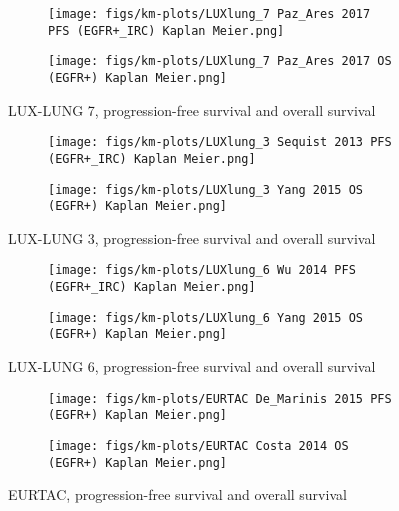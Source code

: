 \documentclass[11pt,final,fleqn]{article}\usepackage[]{graphicx}\usepackage[]{color}
\theoremstyle{plain}
\begin{document}
\begin{appendices}
\begin{figure}
\centering
\begin{subfigure}{\textwidth}
\centering
\texttt{[image: figs/km-plots/LUXlung\_7 Paz\_Ares 2017 PFS (EGFR+\_IRC) Kaplan Meier.png]}
\end{subfigure}
\begin{subfigure}{\textwidth}
\texttt{[image: figs/km-plots/LUXlung\_7 Paz\_Ares 2017 OS (EGFR+) Kaplan Meier.png]}
\end{subfigure}
\centering
\caption{LUX-LUNG 7, progression-free survival and overall survival}\label{fig:LUX-LUNG 7}
\end{figure}


\begin{figure}
\centering
\begin{subfigure}{\textwidth}
\centering
\texttt{[image: figs/km-plots/LUXlung\_3 Sequist 2013 PFS (EGFR+\_IRC) Kaplan Meier.png]}
\end{subfigure}
\begin{subfigure}{\textwidth}
\texttt{[image: figs/km-plots/LUXlung\_3 Yang 2015 OS (EGFR+) Kaplan Meier.png]}
\end{subfigure}
\centering
\caption{LUX-LUNG 3, progression-free survival and overall survival}\label{fig:LUX-LUNG 3}
\end{figure}


\begin{figure}
\centering
\begin{subfigure}{\textwidth}
\centering
\texttt{[image: figs/km-plots/LUXlung\_6 Wu 2014 PFS (EGFR+\_IRC) Kaplan Meier.png]}
\end{subfigure}
\begin{subfigure}{\textwidth}
\texttt{[image: figs/km-plots/LUXlung\_6 Yang 2015 OS (EGFR+) Kaplan Meier.png]}
\end{subfigure}
\centering
\caption{LUX-LUNG 6, progression-free survival and overall survival}\label{fig:LUX-LUNG 6}
\end{figure}

\begin{figure}
\centering
\begin{subfigure}{\textwidth}
\centering
\texttt{[image: figs/km-plots/EURTAC De\_Marinis 2015 PFS (EGFR+) Kaplan Meier.png]}
\end{subfigure}
\begin{subfigure}{\textwidth}
\texttt{[image: figs/km-plots/EURTAC Costa 2014 OS (EGFR+) Kaplan Meier.png]}
\end{subfigure}
\centering
\caption{EURTAC, progression-free survival and overall survival}\label{fig:EURTAC}
\end{figure}



\end{appendices}
\end{document}
